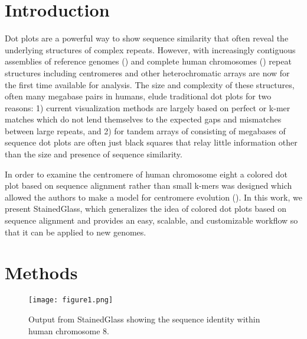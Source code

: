 \documentclass[nocrop, noinfo]{bioinfo}
\begin{document}
\section{Introduction}
Dot plots are a powerful way to show sequence similarity that often reveal the
underlying structures of complex repeats. However, with increasingly contiguous
assemblies of reference genomes (\citealp{Rhie2021-zg}) and complete human
chromosomes (\citealp{Miga2020-pj,Logsdon2021-zr,Nurk2021-wb}) repeat structures
including centromeres and other heterochromatic arrays are now for the first
time available for analysis. The size and complexity of these structures, often
many megabase pairs in humans, elude traditional dot plots for two reasons: 1)
current visualization methods are largely based on perfect or k-mer matches
which do not lend themselves to the expected gaps and mismatches between large
repeats, and 2) for tandem arrays of consisting of megabases of sequence dot
plots are often just black squares that relay little information other than the
size and presence of sequence similarity. 

In order to examine the centromere of human chromosome eight a colored dot plot
based on sequence alignment rather than small k-mers was designed which allowed
the authors to make a model for centromere evolution (\citealp{Logsdon2021-zr}).
In this work, we present StainedGlass, which generalizes the idea of colored dot
plots based on sequence alignment and provides an easy, scalable, and
customizable workflow so that it can be applied to new genomes. 

\section{Methods} 
\begin{figure*}[!tpb]%
\centerline{
	\texttt{[image: figure1.png]}
}
\caption{Output from StainedGlass showing the sequence identity within human
chromosome 8.}
\label{fig:01} 
\end{figure*}
\end{document}
